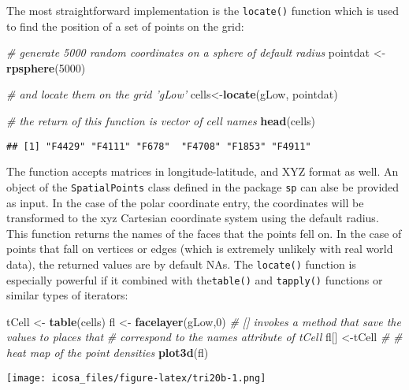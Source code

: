 \documentclass[]{article}
\newenvironment{Shaded}{\begin{snugshade}}{\end{snugshade}}
\newcommand{\KeywordTok}[1]{\textcolor[rgb]{0.13,0.29,0.53}{\textbf{#1}}}
\newcommand{\DecValTok}[1]{\textcolor[rgb]{0.00,0.00,0.81}{#1}}
\newcommand{\StringTok}[1]{\textcolor[rgb]{0.31,0.60,0.02}{#1}}
\newcommand{\CommentTok}[1]{\textcolor[rgb]{0.56,0.35,0.01}{\textit{#1}}}
\newcommand{\NormalTok}[1]{#1}
\begin{document}
The most straightforward implementation is the \texttt{locate()}
function which is used to find the position of a set of points on the
grid:

\begin{Shaded}
\begin{Highlighting}[]
\CommentTok{# generate 5000 random coordinates on a sphere of default radius}
\NormalTok{pointdat <-}\StringTok{ }\KeywordTok{rpsphere}\NormalTok{(}\DecValTok{5000}\NormalTok{)}

\CommentTok{# and locate them on the grid 'gLow'}
\NormalTok{cells<-}\KeywordTok{locate}\NormalTok{(gLow, pointdat)}

\CommentTok{# the return of this function is vector of cell names}
\KeywordTok{head}\NormalTok{(cells)}
\end{Highlighting}
\end{Shaded}

\begin{verbatim}
## [1] "F4429" "F4111" "F678"  "F4708" "F1853" "F4911"
\end{verbatim}

The function accepts matrices in longitude-latitude, and XYZ format as
well. An object of the \texttt{SpatialPoints} class defined in the
package \texttt{sp} can alse be provided as input. In the case of the
polar coordinate entry, the coordinates will be transformed to the xyz
Cartesian coordinate system using the default radius. This function
returns the names of the faces that the points fell on. In the case of
points that fall on vertices or edges (which is extremely unlikely with
real world data), the returned values are by default NAs. The
\texttt{locate()} function is especially powerful if it combined with
the\texttt{table()} and \texttt{tapply()} functions or similar types of
iterators:

\begin{Shaded}
\begin{Highlighting}[]
\NormalTok{tCell <-}\StringTok{ }\KeywordTok{table}\NormalTok{(cells)}
\NormalTok{fl <-}\StringTok{ }\KeywordTok{facelayer}\NormalTok{(gLow,}\DecValTok{0}\NormalTok{)}
\CommentTok{# [] invokes a method that save the values to places that }
\CommentTok{# correspond to the names attribute of tCell}
\NormalTok{fl[] <-tCell }\CommentTok{#}
\CommentTok{# heat map of the point densities}
\KeywordTok{plot3d}\NormalTok{(fl)}
\end{Highlighting}
\end{Shaded}

\texttt{[image: icosa\_files/figure-latex/tri20b-1.png]}
\end{document}
